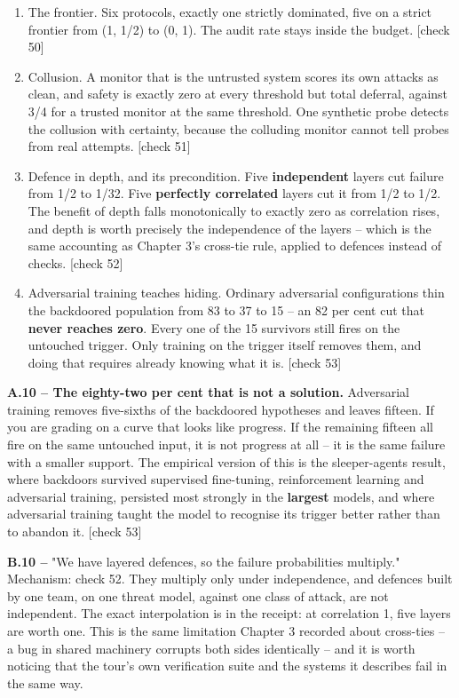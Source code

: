 \begin{enumerate}
\item The frontier. Six protocols, exactly one strictly dominated, five on a strict frontier from (1, 1/2) to (0, 1). The audit rate stays inside the budget. [check 50]
\item Collusion. A monitor that is the untrusted system scores its own attacks as clean, and safety is exactly zero at every threshold but total deferral, against 3/4 for a trusted monitor at the same threshold. One synthetic probe detects the collusion with certainty, because the colluding monitor cannot tell probes from real attempts. [check 51]
\item Defence in depth, and its precondition. Five \textbf{independent} layers cut failure from 1/2 to 1/32. Five \textbf{perfectly correlated} layers cut it from 1/2 to 1/2. The benefit of depth falls monotonically to exactly zero as correlation rises, and depth is worth precisely the independence of the layers -- which is the same accounting as Chapter 3's cross-tie rule, applied to defences instead of checks. [check 52]
\item Adversarial training teaches hiding. Ordinary adversarial configurations thin the backdoored population from 83 to 37 to 15 -- an 82 per cent cut that \textbf{never reaches zero}. Every one of the 15 survivors still fires on the untouched trigger. Only training on the trigger itself removes them, and doing that requires already knowing what it is. [check 53]
\end{enumerate}


\textbf{A.10 -- The eighty-two per cent that is not a solution.} Adversarial training removes five-sixths of the backdoored hypotheses and leaves fifteen. If you are grading on a curve that looks like progress. If the remaining fifteen all fire on the same untouched input, it is not progress at all -- it is the same failure with a smaller support. The empirical version of this is the sleeper-agents result, where backdoors survived supervised fine-tuning, reinforcement learning and adversarial training, persisted most strongly in the \textbf{largest} models, and where adversarial training taught the model to recognise its trigger better rather than to abandon it. [check 53]

\textbf{B.10 --} "We have layered defences, so the failure probabilities multiply." Mechanism: check 52. They multiply only under independence, and defences built by one team, on one threat model, against one class of attack, are not independent. The exact interpolation is in the receipt: at correlation 1, five layers are worth one. This is the same limitation Chapter 3 recorded about cross-ties -- a bug in shared machinery corrupts both sides identically -- and it is worth noticing that the tour's own verification suite and the systems it describes fail in the same way.

